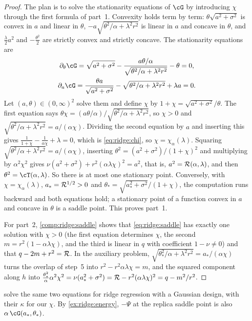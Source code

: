 \begin{refsection}
\begin{proof}
The plan is to solve the stationarity equations of $\cG$ by introducing $\chi$ through the first formula of part~1. Convexity holds term by term: $\theta\sqrt{a^2+\sigma^2}$ is convex in $a$ and linear in $\theta$, $-a\sqrt{\theta^2/\alpha+\lambda^2r^2}$ is linear in $a$ and concave in $\theta$, and $\frac\lambda2a^2$ and $-\frac{\theta^2}2$ are strictly convex and strictly concave. The stationarity equations are
\begin{gather*}
\partial_\theta\cG=\sqrt{a^2+\sigma^2}-\frac{a\theta/\alpha}{\sqrt{\theta^2/\alpha+\lambda^2r^2}}-\theta=0,\\
\partial_a\cG=\frac{\theta a}{\sqrt{a^2+\sigma^2}}-\sqrt{\theta^2/\alpha+\lambda^2r^2}+\lambda a=0.
\end{gather*}
Let $(a,\theta)\in(0,\infty)^2$ solve them and define $\chi$ by $1+\chi=\sqrt{a^2+\sigma^2}/\theta$. The first equation says $\theta\chi=(a\theta/\alpha)/\sqrt{\theta^2/\alpha+\lambda^2r^2}$, so $\chi>0$ and $\sqrt{\theta^2/\alpha+\lambda^2r^2}=a/(\alpha\chi)$. Dividing the second equation by $a$ and inserting this gives $\frac1{1+\chi}-\frac1{\alpha\chi}+\lambda=0$, which is \eqref{eq:ridge:chi}, so $\chi=\chi_\alpha(\lambda)$. Squaring $\sqrt{\theta^2/\alpha+\lambda^2r^2}=a/(\alpha\chi)$, inserting $\theta^2=(a^2+\sigma^2)/(1+\chi)^2$ and multiplying by $\alpha^2\chi^2$ gives $\nu(a^2+\sigma^2)+r^2(\alpha\lambda\chi)^2=a^2$, that is, $a^2=\mathcal{R}(\alpha,\lambda)$, and then $\theta^2=\cT(\alpha,\lambda)$. So there is at most one stationary point. Conversely, with $\chi=\chi_\alpha(\lambda)$, $a_*=\mathcal{R}^{1/2}>0$ and $\theta_*=\sqrt{a_*^2+\sigma^2}/(1+\chi)$, the computation runs backward and both equations hold; a stationary point of a function convex in $a$ and concave in $\theta$ is a saddle point. This proves part~1.

For part~2, \cref{comp:ridge:saddle} shows that \eqref{eq:ridge:saddle} has exactly one solution with $\chi>0$ (the first equation determines $\chi$, the second $m=r^2(1-\alpha\lambda\chi)$, and the third is linear in $q$ with coefficient $1-\nu\ne0$) and that $q-2m+r^2=\mathcal{R}$. In the auxiliary problem, $\sqrt{\theta_*^2/\alpha+\lambda^2r^2}=a_*/(\alpha\chi)$ turns the overlap of step~5 into $r^2-r^2\alpha\lambda\chi=m$, and the squared component along $h$ into $\frac{\theta_*^2}\alpha\alpha^2\chi^2=\nu(a_*^2+\sigma^2)=\mathcal{R}-r^2(\alpha\lambda\chi)^2=q-m^2/r^2$.
\end{proof}

\textcite[Remark~5.2.2]{ThrampoulidisAbbasiHassibi2018} solve the same two equations for ridge regression with a Gaussian design, with their $\kappa$ for our $\chi$. By \cref{ex:ridge:energy}, $-\Psi$ at the replica saddle point is also $\alpha\,\cG(a_*,\theta_*)$.


\end{refsection}
